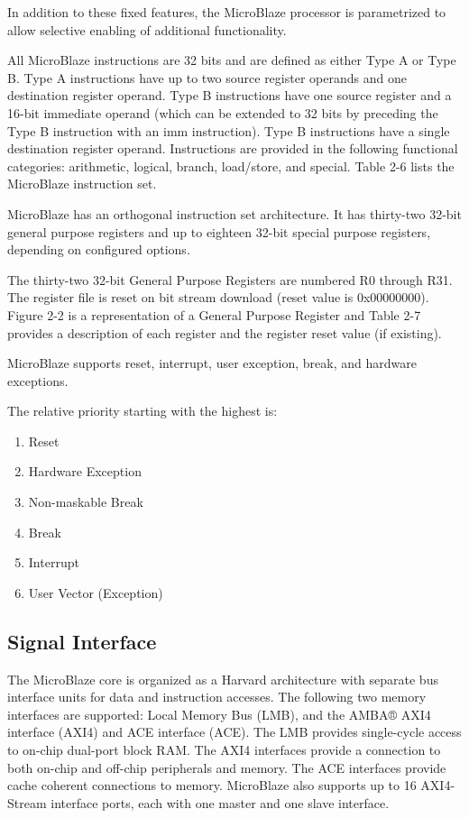 In addition to these fixed features, the MicroBlaze processor is parametrized to allow
selective enabling of additional functionality.

All MicroBlaze instructions are 32 bits and are defined as either Type A or Type B. Type A
instructions have up to two source register operands and one destination register operand.
Type B instructions have one source register and a 16-bit immediate operand (which can be
extended to 32 bits by preceding the Type B instruction with an imm instruction). Type B
instructions have a single destination register operand. Instructions are provided in the
following functional categories: arithmetic, logical, branch, load/store, and special.
Table 2-6 lists the MicroBlaze instruction set. 

MicroBlaze has an orthogonal instruction set architecture. It has thirty-two 32-bit general
purpose registers and up to eighteen 32-bit special purpose registers, depending on
configured options.

The thirty-two 32-bit General Purpose Registers are numbered R0 through R31. The register
file is reset on bit stream download (reset value is 0x00000000). Figure 2-2 is a
representation of a General Purpose Register and Table 2-7 provides a description of each
register and the register reset value (if existing).

MicroBlaze supports reset, interrupt, user exception, break, and hardware exceptions.

The relative priority starting with the highest is:
\begin{enumerate}
	\item Reset
	\item Hardware Exception
	\item Non-maskable Break
	\item Break
	\item Interrupt
	\item User Vector (Exception)
\end{enumerate}

\subsection{Signal Interface}

The MicroBlaze core is organized as a Harvard architecture with separate bus interface units
for data and instruction accesses. The following two memory interfaces are supported:
Local Memory Bus (LMB), and the AMBA® AXI4 interface (AXI4) and ACE interface (ACE).
The LMB provides single-cycle access to on-chip dual-port block RAM. The AXI4 interfaces
provide a connection to both on-chip and off-chip peripherals and memory. The ACE
interfaces provide cache coherent connections to memory.
MicroBlaze also supports up to 16 AXI4-Stream interface ports, each with one master and
one slave interface.


